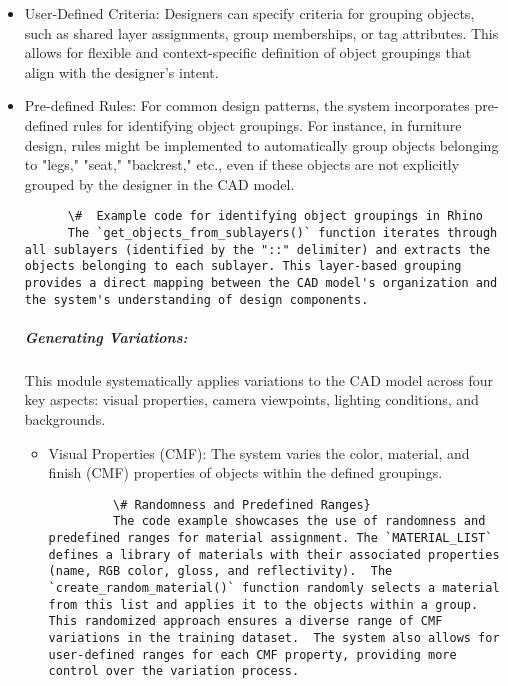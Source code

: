\documentclass{article}
\begin{document}
    \begin{itemize}
        \item User-Defined Criteria: Designers can specify criteria for grouping objects, such as shared layer assignments, group memberships, or tag attributes. This allows for flexible and context-specific definition of object groupings that align with the designer's intent.

        \item Pre-defined Rules: For common design patterns, the system incorporates pre-defined rules for identifying object groupings. For instance, in furniture design, rules might be implemented to automatically group objects belonging to "legs," "seat," "backrest," etc., even if these objects are not explicitly grouped by the designer in the CAD model.

    \begin{verbatim}
      \#  Example code for identifying object groupings in Rhino
      The `get_objects_from_sublayers()` function iterates through all sublayers (identified by the "::" delimiter) and extracts the objects belonging to each sublayer. This layer-based grouping provides a direct mapping between the CAD model's organization and the system's understanding of design components.
    \end{verbatim}  

\subparagraph{Generating Variations:}  This module systematically applies variations to the CAD model across four key aspects: visual properties, camera viewpoints, lighting conditions, and backgrounds.

    \begin{itemize}
        \item Visual Properties (CMF): The system varies the color, material, and finish (CMF) properties of objects within the defined groupings.

        \begin{verbatim}
         \# Randomness and Predefined Ranges}
         The code example showcases the use of randomness and predefined ranges for material assignment. The `MATERIAL_LIST` defines a library of materials with their associated properties (name, RGB color, gloss, and reflectivity).  The `create_random_material()` function randomly selects a material from this list and applies it to the objects within a group. This randomized approach ensures a diverse range of CMF variations in the training dataset.  The system also allows for user-defined ranges for each CMF property, providing more control over the variation process.
        \end{verbatim}


\end{itemize}
\end{itemize}
\end{document}
